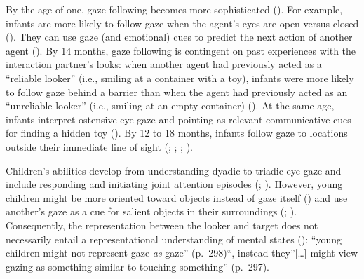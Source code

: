 \documentclass[
]{scrbook}
\begin{document}
By the age of one, gaze following becomes more sophisticated (). For example, infants are more likely to follow gaze when the agent's eyes are open versus closed (). They can use gaze (and emotional) cues to predict the next action of another agent (). By 14 months, gaze following is contingent on past experiences with the interaction partner's looks: when another agent had previously acted as a ``reliable looker'' (i.e., smiling at a container with a toy), infants were more likely to follow gaze behind a barrier than when the agent had previously acted as an ``unreliable looker'' (i.e., smiling at an empty container) (). At the same age, infants interpret ostensive eye gaze and pointing as relevant communicative cues for finding a hidden toy (). By 12 to 18 months, infants follow gaze to locations outside their immediate line of sight (; ; ; ).

Children's abilities develop from understanding dyadic to triadic eye gaze and include responding and initiating joint attention episodes (; ). However, young children might be more oriented toward objects instead of gaze itself () and use another's gaze as a cue for salient objects in their surroundings (; ). Consequently, the representation between the looker and target does not necessarily entail a representational understanding of mental states (): ``young children might not represent gaze \emph{as} gaze'' (p.~298)``, instead they''{[}\ldots{]} might view gazing as something similar to touching something'' (p.~297).
\end{document}
